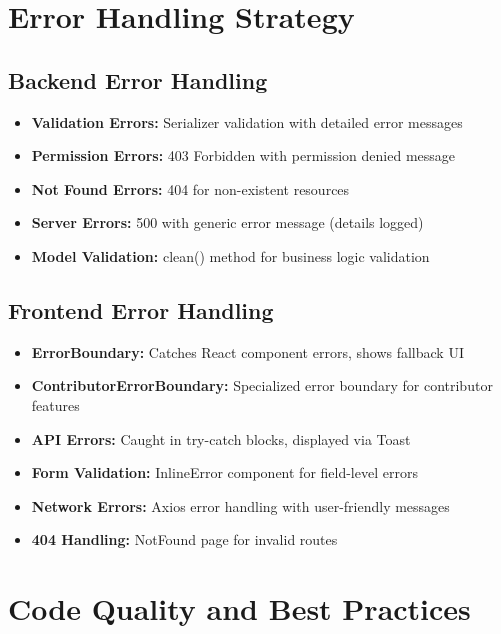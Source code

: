 \documentclass[11pt,a4paper]{article}
\begin{document}
\section{Error Handling Strategy}

\subsection{Backend Error Handling}
\begin{itemize}[leftmargin=*]
    \item \textbf{Validation Errors:} Serializer validation with detailed error messages
    \item \textbf{Permission Errors:} 403 Forbidden with permission denied message
    \item \textbf{Not Found Errors:} 404 for non-existent resources
    \item \textbf{Server Errors:} 500 with generic error message (details logged)
    \item \textbf{Model Validation:} clean() method for business logic validation
\end{itemize}

\subsection{Frontend Error Handling}
\begin{itemize}[leftmargin=*]
    \item \textbf{ErrorBoundary:} Catches React component errors, shows fallback UI
    \item \textbf{ContributorErrorBoundary:} Specialized error boundary for contributor features
    \item \textbf{API Errors:} Caught in try-catch blocks, displayed via Toast
    \item \textbf{Form Validation:} InlineError component for field-level errors
    \item \textbf{Network Errors:} Axios error handling with user-friendly messages
    \item \textbf{404 Handling:} NotFound page for invalid routes
\end{itemize}

\section{Code Quality and Best Practices}
\end{document}
